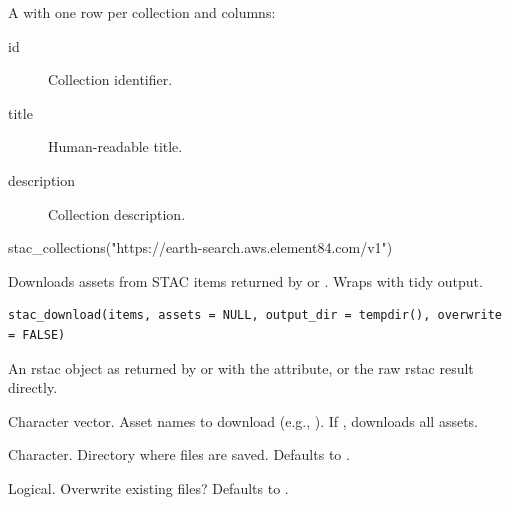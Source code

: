 \documentclass[a4paper]{book}
\begin{document}
%
\begin{Value}
A  with one row per collection and columns:
\begin{description}

\item[id] Collection identifier.
\item[title] Human-readable title.
\item[description] Collection description.

\end{description}

\end{Value}
%
\begin{Examples}
\begin{ExampleCode}

stac_collections("https://earth-search.aws.element84.com/v1")

\end{ExampleCode}
\end{Examples}
%
\begin{Description}
Downloads assets from STAC items returned by  or
. Wraps  with tidy output.
\end{Description}
%
\begin{Usage}
\begin{verbatim}
stac_download(items, assets = NULL, output_dir = tempdir(), overwrite = FALSE)
\end{verbatim}
\end{Usage}
%
\begin{Arguments}
\begin{ldescription}
\item[\code{items}] An rstac  object as returned by  or
 with the  attribute, or the raw rstac result directly.

\item[\code{assets}] Character vector. Asset names to download (e.g.,
). If , downloads all assets.

\item[\code{output\_dir}] Character. Directory where files are saved.
Defaults to .

\item[\code{overwrite}] Logical. Overwrite existing files? Defaults to .
\end{ldescription}
\end{Arguments}
\end{document}
